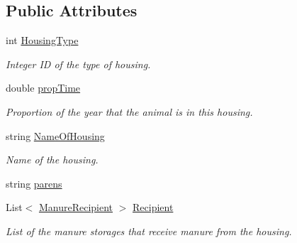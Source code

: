 \subsection*{Public Attributes}
\begin{DoxyCompactItemize}
\item 
\mbox{\label{structlivestock_1_1housing_record_a3e532e43462b184a6bcde53c6e7b047b}} 
int \mbox{\hyperlink{structlivestock_1_1housing_record_a3e532e43462b184a6bcde53c6e7b047b}{Housing\+Type}}
\begin{DoxyCompactList}\small\item\em Integer ID of the type of housing. \end{DoxyCompactList}\item 
\mbox{\label{structlivestock_1_1housing_record_aefaaa48895680f2d4f90ad4ca14f2c4e}} 
double \mbox{\hyperlink{structlivestock_1_1housing_record_aefaaa48895680f2d4f90ad4ca14f2c4e}{prop\+Time}}
\begin{DoxyCompactList}\small\item\em Proportion of the year that the animal is in this housing. \end{DoxyCompactList}\item 
\mbox{\label{structlivestock_1_1housing_record_a8a33c1c98dbd03f6a305a87372050d6b}} 
string \mbox{\hyperlink{structlivestock_1_1housing_record_a8a33c1c98dbd03f6a305a87372050d6b}{Name\+Of\+Housing}}
\begin{DoxyCompactList}\small\item\em Name of the housing. \end{DoxyCompactList}\item 
string \mbox{\hyperlink{structlivestock_1_1housing_record_a180d9ab0c1e6023d24500933a2f546f7}{parens}}
\item 
\mbox{\label{structlivestock_1_1housing_record_af8ad1589ea0ef0cac608311c445d1ed5}} 
List$<$ \mbox{\hyperlink{structlivestock_1_1_manure_recipient}{Manure\+Recipient}} $>$ \mbox{\hyperlink{structlivestock_1_1housing_record_af8ad1589ea0ef0cac608311c445d1ed5}{Recipient}}
\begin{DoxyCompactList}\small\item\em List of the manure storages that receive manure from the housing. \end{DoxyCompactList}\end{DoxyCompactItemize}


